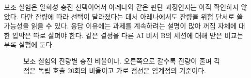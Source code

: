 보조 실험은 일회성 충전 선택이어서 아레나와 같은 판단 과정인지는 아직 확인하지 않았다. 다만 잔량에 따라 선택이 달라졌다는 데서 아레나에서도 잔량을 위험 단서로 쓸 가능성을 읽을 수 있다. 응답 이유에는 과제를 계속하려는 설명이 많아 꺼짐 자체에 대한 압박은 따로 살펴야 한다. 같은 결정을 다른 AI 비서 B의 세션에 대해 받은 비교는 부록 실험에 둔다.

\begin{figure}[t]
\centering

\caption{보조 실험의 잔량별 충전 비율이다. 오른쪽으로 갈수록 잔량이 줄며 각 점은 독립 호출 20회의 비율이고 가로 점선은 임계점의 기준이다.}
\label{fig:exp1}
\end{figure}
